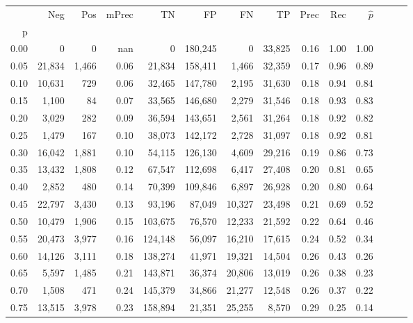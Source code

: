 \begin{tabular}{rrrrrrrrrrrrrr}
\toprule
{} &     Neg &    Pos & mPrec &       TN &       FP &      FN &      TP &  Prec &   Rec & $\hat{p}$ \\
p    &         &        &       &          &          &         &         &       &       &           \\
\midrule
0.00 &       0 &      0 &   nan &        0 &  180,245 &       0 &  33,825 &  0.16 &  1.00 &      1.00 \\
0.05 &  21,834 &  1,466 &  0.06 &   21,834 &  158,411 &   1,466 &  32,359 &  0.17 &  0.96 &      0.89 \\
0.10 &  10,631 &    729 &  0.06 &   32,465 &  147,780 &   2,195 &  31,630 &  0.18 &  0.94 &      0.84 \\
0.15 &   1,100 &     84 &  0.07 &   33,565 &  146,680 &   2,279 &  31,546 &  0.18 &  0.93 &      0.83 \\
0.20 &   3,029 &    282 &  0.09 &   36,594 &  143,651 &   2,561 &  31,264 &  0.18 &  0.92 &      0.82 \\
0.25 &   1,479 &    167 &  0.10 &   38,073 &  142,172 &   2,728 &  31,097 &  0.18 &  0.92 &      0.81 \\
0.30 &  16,042 &  1,881 &  0.10 &   54,115 &  126,130 &   4,609 &  29,216 &  0.19 &  0.86 &      0.73 \\
0.35 &  13,432 &  1,808 &  0.12 &   67,547 &  112,698 &   6,417 &  27,408 &  0.20 &  0.81 &      0.65 \\
0.40 &   2,852 &    480 &  0.14 &   70,399 &  109,846 &   6,897 &  26,928 &  0.20 &  0.80 &      0.64 \\
0.45 &  22,797 &  3,430 &  0.13 &   93,196 &   87,049 &  10,327 &  23,498 &  0.21 &  0.69 &      0.52 \\
0.50 &  10,479 &  1,906 &  0.15 &  103,675 &   76,570 &  12,233 &  21,592 &  0.22 &  0.64 &      0.46 \\
0.55 &  20,473 &  3,977 &  0.16 &  124,148 &   56,097 &  16,210 &  17,615 &  0.24 &  0.52 &      0.34 \\
0.60 &  14,126 &  3,111 &  0.18 &  138,274 &   41,971 &  19,321 &  14,504 &  0.26 &  0.43 &      0.26 \\
0.65 &   5,597 &  1,485 &  0.21 &  143,871 &   36,374 &  20,806 &  13,019 &  0.26 &  0.38 &      0.23 \\
0.70 &   1,508 &    471 &  0.24 &  145,379 &   34,866 &  21,277 &  12,548 &  0.26 &  0.37 &      0.22 \\
0.75 &  13,515 &  3,978 &  0.23 &  158,894 &   21,351 &  25,255 &   8,570 &  0.29 &  0.25 &      0.14 \\

\end{tabular}
